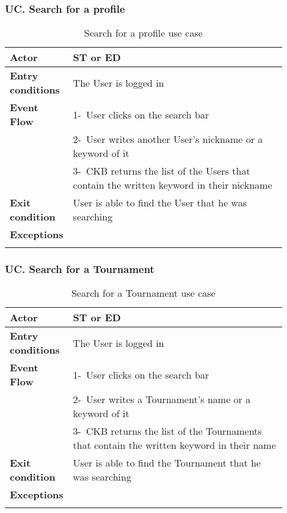 \subsubsection*{UC\cuc . Search for a profile}
\begin{center}
    \begin{longtable}{|l|p{0.9\linewidth}|}
        \hline
        \textbf{Actor}            & ST or ED                                                                                                                                                                                       \\
        \hline
        \textbf{Entry conditions} & The User is logged in  \\
        \hline
        \textbf{Event Flow}       & 1-\ User clicks on the search bar        \\
        & 2-\ User writes another User's nickname or a keyword of it \\
        & 3-\ CKB returns the list of the Users that contain the written keyword in their nickname         \\
        \hline
        \textbf{Exit condition}   & User is able to find the User that he was searching        \\
        \hline
        \textbf{Exceptions}        &  \\%
        \hline
        \caption{Search for a profile use case}
        \label{tab: search_for_a_profile_use_case}
    \end{longtable}
\end{center}

\subsubsection*{UC\cuc . Search for a Tournament}
\begin{center}
    \begin{longtable}{|l|p{0.9\linewidth}|}
        \hline
        \textbf{Actor}            & ST or ED                                                                                                                                                                                       \\
        \hline
        \textbf{Entry conditions} & The User is logged in  \\
        \hline
        \textbf{Event Flow}       & 1-\ User clicks on the search bar        \\
        & 2-\ User writes a Tournament's name or a keyword of it \\
        & 3-\ CKB returns the list of the Tournaments that contain the written keyword in their name         \\
        \hline
        \textbf{Exit condition}   & User is able to find the Tournament that he was searching        \\
        \hline
        \textbf{Exceptions}        &  \\%
        \hline
        \caption{Search for a Tournament use case}
        \label{tab: search_for_a_Tournament_use_case}
    \end{longtable}
\end{center}




